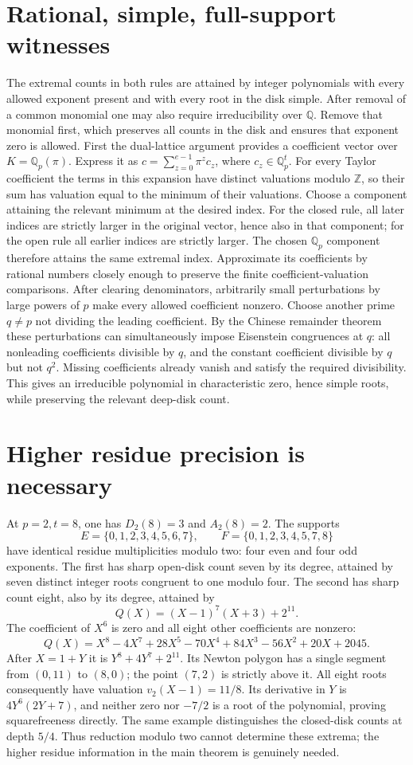 \section{Rational, simple, full-support witnesses}
The extremal counts in both rules are attained by integer polynomials
with every allowed exponent present and with every root in the disk
simple. After removal of a common monomial one may also require
irreducibility over $\mathbb Q$. Remove that monomial first, which
preserves all counts in the disk and ensures that exponent zero is allowed.
First the dual-lattice argument provides a coefficient vector over
$K=\mathbb Q_p(\pi)$. Express it as
$c=\sum_{z=0}^{e-1}\pi^z c_z$, where $c_z\in\mathbb Q_p^t$.
For every Taylor coefficient the terms in this expansion have distinct
valuations modulo $\mathbb Z$, so their sum has valuation equal to the
minimum of their valuations. Choose a component attaining the relevant
minimum at the desired index. For the closed rule, all later indices
are strictly larger in the original vector, hence also in that
component; for the open rule all earlier indices are strictly larger.
The chosen $\mathbb Q_p$ component therefore attains the same extremal
index. Approximate its coefficients by rational numbers closely enough
to preserve the finite coefficient-valuation comparisons. After
clearing denominators, arbitrarily small perturbations by large powers
of $p$ make every allowed coefficient nonzero. Choose another prime
$q\ne p$ not dividing the leading coefficient. By the Chinese remainder
theorem these perturbations can simultaneously impose Eisenstein
congruences at $q$: all nonleading coefficients divisible by $q$, and
the constant coefficient divisible by $q$ but not $q^2$. Missing
coefficients already vanish and satisfy the required divisibility.
This gives an irreducible polynomial in characteristic zero, hence
simple roots, while preserving the relevant deep-disk count.

\section{Higher residue precision is necessary}
At $p=2,t=8$, one has $D_2(8)=3$ and $A_2(8)=2$.
The supports
\[
 E=\{0,1,2,3,4,5,6,7\},\qquad
 F=\{0,1,2,3,4,5,7,8\}
\]
have identical residue multiplicities modulo two: four even and four
odd exponents. The first has sharp open-disk count seven by its degree,
attained by seven distinct integer roots congruent to one modulo four.
The second has sharp count eight, also by its degree, attained by
\[
 Q(X)=(X-1)^7(X+3)+2^{11}.
\]
The coefficient of $X^6$ is zero and all eight other coefficients are
nonzero:
\[
 Q(X)=X^8-4X^7+28X^5-70X^4+84X^3-56X^2+20X+2045.
\]
After $X=1+Y$ it is $Y^8+4Y^7+2^{11}$. Its Newton polygon has a single
segment from $(0,11)$ to $(8,0)$; the point $(7,2)$ is strictly above it.
All eight roots consequently have valuation $v_2(X-1)=11/8$.
Its derivative in $Y$ is $4Y^6(2Y+7)$, and neither zero nor $-7/2$ is a
root of the polynomial, proving squarefreeness directly. The same
example distinguishes the closed-disk counts at depth $5/4$.
Thus reduction modulo two cannot determine these extrema; the higher
residue information in the main theorem is genuinely needed.

